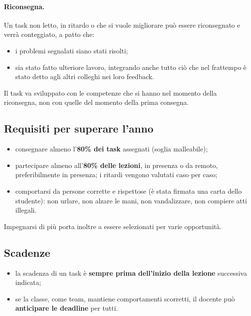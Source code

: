 \paragraph{Riconsegna.} Un task non letto, in ritardo o che si vuole
migliorare può essere riconsegnato e verrà conteggiato, a patto che:
\begin{itemize}
  \item i problemi segnalati siano stati risolti;
  \item sia stato fatto ulteriore lavoro, integrando anche tutto ciò che nel
        frattempo è stato detto agli altri colleghi nei loro feedback.
\end{itemize}
Il task va sviluppato con le competenze che si hanno nel momento della
riconsegna, non con quelle del momento della prima consegna.

\subsection{Requisiti per superare l'anno}

\begin{itemize}
  \item consegnare almeno l'\textbf{80\% dei task} assegnati (soglia
        malleabile);
  \item partecipare almeno all'\textbf{80\% delle lezioni}, in presenza o
        da remoto, preferibilmente in presenza; i ritardi vengono valutati
        caso per caso;
  \item comportarsi da persone corrette e rispettose (è stata firmata una
        carta dello studente): non urlare, non alzare le mani, non
        vandalizzare, non compiere atti illegali.
\end{itemize}
Impegnarsi di più porta inoltre a essere selezionati per varie opportunità.

\subsection{Scadenze}

\begin{itemize}
  \item la scadenza di un task è \textbf{sempre prima dell'inizio della
        lezione} successiva indicata;
  \item se la classe, come team, mantiene comportamenti scorretti, il docente
        può \textbf{anticipare le deadline} per tutti.
\end{itemize}

